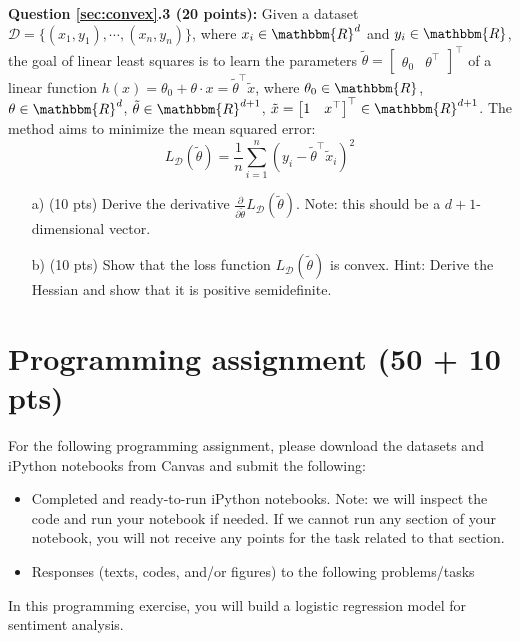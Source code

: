\documentclass[12pt]{article}
\begin{document}
\textbf{Question \ref{sec:convex}.3 (20 points):} Given a dataset $\mathcal{D}=\{(x_1,y_1),\cdots,(x_n,y_n)\}$, where $x_i\in\mathbbm{R}^d$ and $y_i\in\mathbbm{R}$, the goal of linear least squares is to learn the parameters $\tilde\theta=\begin{bmatrix} \theta_0&\theta^\top\end{bmatrix}^\top$ of a linear function $h(x)=\theta_0+\theta\cdot x=\tilde\theta^\top \tilde x$, where $\theta_0\in\mathbbm{R}$, $\theta\in\mathbbm{R}^d$, $\tilde\theta\in\mathbbm{R}^{d+1}$, $\tilde x=\begin{bmatrix} 1&x^\top\end{bmatrix}^\top\in\mathbbm{R}^{d+1}$. The method aims to minimize the mean squared error:
\begin{equation*}
    L_\mathcal{D}(\tilde\theta)=\frac{1}{n}\sum_{i=1}^n(y_i-\tilde\theta^\top \tilde x_i)^2
\end{equation*}
\begin{enumerate}
    \item[a)] (10 pts) Derive the derivative $\frac{\partial}{\partial \tilde\theta}L_\mathcal{D}(\tilde\theta)$. Note: this should be a $d+1$-dimensional vector.
    \item[b)] (10 pts) Show that the loss function $L_\mathcal{D}(\tilde\theta)$ is convex. Hint: Derive the Hessian and show that it is positive semidefinite.
\end{enumerate} 

\section{Programming assignment (50 + 10 pts)}

For the following programming assignment, please download the datasets and iPython notebooks from Canvas and submit the following:
\begin{itemize}
    \item Completed and ready-to-run iPython notebooks. Note: we will inspect the code and run your notebook if needed. If we cannot run any section of your notebook, you will not receive any points for the task related to that section. 
    \item Responses (texts, codes, and/or figures) to the following problems/tasks
\end{itemize}


In this programming exercise, you will build a logistic regression model for sentiment analysis.
\end{document}
